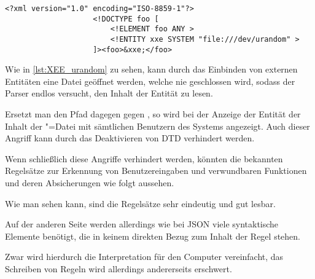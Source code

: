                 \begin{lstlisting}[caption={Diese XEE legt den Parser lahm}, label={lst:XEE_urandom}, gobble=20]
                    <?xml version="1.0" encoding="ISO-8859-1"?>
                    <!DOCTYPE foo [
                        <!ELEMENT foo ANY >
                        <!ENTITY xxe SYSTEM "file:///dev/urandom" >
                    ]><foo>&xxe;</foo>
                \end{lstlisting}

                Wie in
                \vref{lst:XEE_urandom} zu sehen,
                kann durch das Einbinden von externen Entitäten eine Datei geöffnet werden,
                welche nie geschlossen wird,
                sodass der Parser endlos versucht,
                den Inhalt der Entität zu lesen.

                Ersetzt man den Pfad
                 dagegen gegen
                ,
                so wird bei der Anzeige der Entität der Inhalt der
                "=Datei mit sämtlichen Benutzern des Systems angezeigt.\cite{Smithline2017}
                Auch dieser Angriff kann durch das Deaktivieren von
                \gls{DTD} verhindert werden.

                Wenn schließlich diese Angriffe verhindert werden,
                könnten die bekannten Regelsätze zur Erkennung von Benutzereingaben und
                verwundbaren Funktionen und
                deren Absicherungen
                wie folgt aussehen.

                

                

                Wie man sehen kann,
                sind die Regelsätze sehr eindeutig und
                gut lesbar.

                Auf der anderen Seite werden allerdings
                wie bei
                \gls{JSON} viele syntaktische Elemente benötigt,
                die in keinem direkten Bezug zum Inhalt der Regel stehen.

                Zwar wird hierdurch die Interpretation für den Computer vereinfacht,
                das Schreiben von Regeln wird allerdings andererseits erschwert.


